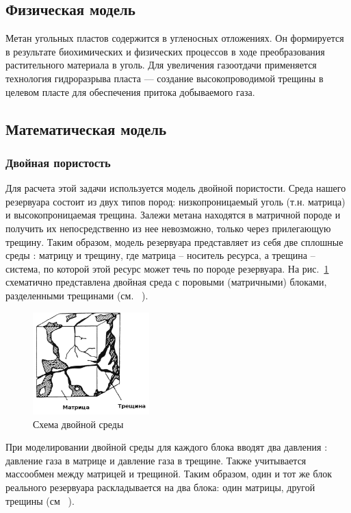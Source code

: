\documentclass[12pt,a4paper]{article}
\begin{document}
\subsection{Физическая модель}
Метан угольных пластов содержится в угленосных отложениях. Он формируется в результате биохимических и физических процессов в ходе преобразования растительного материала в уголь.
Для увеличения газоотдачи применяется технология гидроразрыва пласта --- создание высокопроводимой трещины в целевом пласте для обеспечения притока добываемого газа.

\subsection{Математическая модель}
\subsubsection{Двойная пористость}
Для расчета этой задачи используется модель двойной пористости. Среда нашего резервуара состоит из двух типов пород: низкопроницаемый уголь (т.н. матрица) и высокопроницаемая трещина.
Залежи метана находятся в матричной породе и получить их непосредственно из нее невозможно, только через прилегающую трещину. Таким образом, модель резервуара представляет из себя две сплошные среды : матрицу и трещину, где матрица -- носитель ресурса, а трещина -- система, по которой этой ресурс может течь по породе резервуара. На рис.~\ref{DPscheme}  схематично представлена двойная среда с поровыми (матричными) блоками, разделенными трещинами (см. ~\cite{Aziz}).

\begin{figure} [!h]
\begin{center}
\caption{Схема двойной среды}
\includegraphics[width=0.4\textwidth]{pics/DPscheme_Aziz.png}
\end{center}
 \label{DPscheme}
\end{figure}

При моделировании двойной среды для каждого блока вводят два давления : давление газа в матрице и давление газа в трещине. Также учитывается массообмен между матрицей и трещиной. Таким образом, один и тот же блок реального резервуара раскладывается на два блока: один матрицы, другой трещины (см ~\cite{Chen}).
\end{document}
